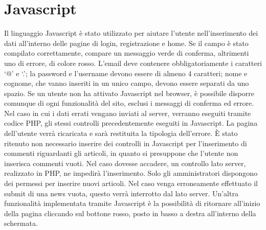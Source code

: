 \documentclass[10pt, a4paper]{article}
\begin{document}
\section{Javascript}
Il linguaggio Javascript è stato utilizzato per aiutare l’utente nell'inserimento dei dati all'interno delle pagine di login, registrazione e home. Se il campo è stato compilato correttamente, compare un messaggio verde di conferma, altrimenti uno di errore, di colore rosso. L’email deve contenere obbligatoriamente i caratteri ‘@’ e ‘.’;  la password e l'username devono essere di almeno 4 caratteri; nome e cognome, che vanno inseriti in un unico campo, devono essere separati da uno spazio. Se un utente non ha attivato Javascript nel browser, è possibile disporre comunque di ogni funzionalità del sito, esclusi i messaggi di conferma ed errore. Nel caso in cui i dati errati vengano inviati al server, verranno eseguiti tramite codice PHP, gli stessi controlli precedentemente eseguiti in Javascript. La pagina dell’utente verrà ricaricata e sarà restituita la tipologia dell’errore.
È stato ritenuto non necessario inserire dei controlli in Javascript per l'inserimento di commenti riguardanti gli articoli, in quanto si presuppone che l’utente non inserisca commenti vuoti. Nel caso dovesse accadere, un controllo lato server, realizzato in PHP, ne impedirà l’inserimento. Solo gli amministratori dispongono dei permessi per inserire nuovi articoli. Nel caso venga erroneamente effettuato il submit di una news vuota, questo verrà interrotto dal lato server. 
Un’altra funzionalità implementata tramite Javascript è la possibilità di ritornare all'inizio della pagina cliccando sul bottone rosso, posto in basso a destra all'interno della schermata.
\end{document}
